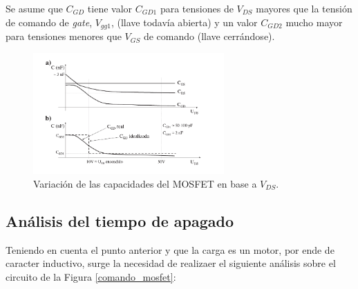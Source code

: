 \documentclass[10pt, a4paper]{report}
\begin{document}
Se asume que $C_{GD}$ tiene valor $C_{GD1}$ para tensiones de $V_{DS}$ mayores
que la tensión de comando de \emph{gate}, $V_{gg1}$, (llave todavía abierta) y
un valor $C_{GD2}$ mucho mayor para tensiones menores que $V_{GS}$ de comando
(llave cerrándose)\cite{Mohan1989}.

\begin{figure}[h!]
	\begin{center}
		\includegraphics[width=0.65\textwidth]{Capacitor_vs_Vds.pdf}
		\caption{Variación de las capacidades del MOSFET en base a $V_{DS}$.}
		\label{aprox_CGD}
	\end{center}
\end{figure}
\FloatBarrier

\subsection{Análisis del tiempo de apagado}

Teniendo en cuenta el punto anterior y que la carga es un motor, por ende de 
caracter inductivo, surge la necesidad de realizaer el siguiente análisis sobre 
el circuito de la Figura \ref{comando_mosfet}:
\end{document}
